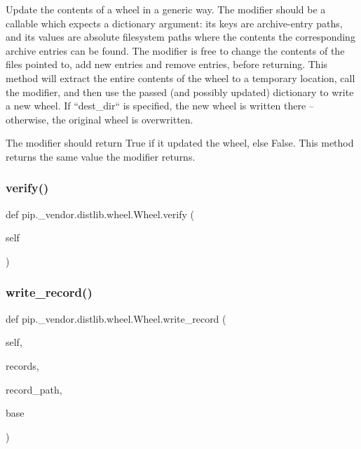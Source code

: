 \begin{DoxyVerb}Update the contents of a wheel in a generic way. The modifier should
be a callable which expects a dictionary argument: its keys are
archive-entry paths, and its values are absolute filesystem paths
where the contents the corresponding archive entries can be found. The
modifier is free to change the contents of the files pointed to, add
new entries and remove entries, before returning. This method will
extract the entire contents of the wheel to a temporary location, call
the modifier, and then use the passed (and possibly updated)
dictionary to write a new wheel. If ``dest_dir`` is specified, the new
wheel is written there -- otherwise, the original wheel is overwritten.

The modifier should return True if it updated the wheel, else False.
This method returns the same value the modifier returns.
\end{DoxyVerb}
 \mbox{\label{classpip_1_1__vendor_1_1distlib_1_1wheel_1_1Wheel_a3792fb283924a1add010ebf4fc259a76}} 
\subsubsection{\texorpdfstring{verify()}{verify()}}
{\footnotesize\ttfamily def pip.\+\_\+vendor.\+distlib.\+wheel.\+Wheel.\+verify (\begin{DoxyParamCaption}\item[{}]{self }\end{DoxyParamCaption})}

\mbox{\label{classpip_1_1__vendor_1_1distlib_1_1wheel_1_1Wheel_a4d29542158c7cef59f91784a5e358449}} 
\subsubsection{\texorpdfstring{write\+\_\+record()}{write\_record()}}
{\footnotesize\ttfamily def pip.\+\_\+vendor.\+distlib.\+wheel.\+Wheel.\+write\+\_\+record (\begin{DoxyParamCaption}\item[{}]{self,  }\item[{}]{records,  }\item[{}]{record\+\_\+path,  }\item[{}]{base }\end{DoxyParamCaption})}

